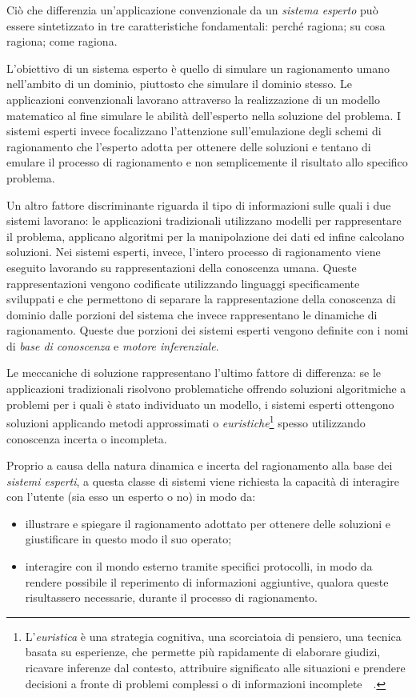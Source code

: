 Ciò che differenzia un'applicazione convenzionale da un \emph{sistema esperto} può essere sintetizzato in tre caratteristiche fondamentali: perché ragiona; su cosa ragiona; come ragiona.

L'obiettivo di un sistema esperto è quello di simulare un ragionamento umano nell'ambito di un dominio, piuttosto che simulare il dominio stesso. Le applicazioni convenzionali lavorano attraverso la realizzazione di un modello matematico al fine simulare le abilità dell'esperto nella soluzione del problema. I sistemi esperti invece focalizzano l'attenzione sull'emulazione degli schemi di ragionamento che l'esperto adotta per ottenere delle soluzioni e tentano di emulare il processo di ragionamento e non semplicemente il risultato allo specifico problema.

Un altro fattore discriminante riguarda il tipo di informazioni sulle quali i due sistemi lavorano: le applicazioni tradizionali utilizzano modelli per rappresentare il problema, applicano algoritmi per la manipolazione dei dati ed infine calcolano soluzioni. Nei sistemi esperti, invece, l'intero processo di ragionamento viene eseguito lavorando su rappresentazioni della conoscenza umana. Queste rappresentazioni vengono codificate utilizzando linguaggi specificamente sviluppati e che permettono di separare la rappresentazione della conoscenza di dominio dalle porzioni del sistema che invece rappresentano le dinamiche di ragionamento. Queste due porzioni dei sistemi esperti vengono definite con i nomi di \emph{base di conoscenza} e \emph{motore inferenziale}.

Le meccaniche di soluzione rappresentano l'ultimo fattore di differenza: se le applicazioni tradizionali risolvono problematiche offrendo soluzioni algoritmiche a problemi per i quali è stato individuato un modello, i sistemi esperti ottengono soluzioni applicando metodi approssimati o \emph{euristiche}\footnote{L’\emph{euristica} è una strategia cognitiva, una scorciatoia di pensiero, una tecnica basata su esperienze, che permette più rapidamente di elaborare giudizi, ricavare inferenze dal contesto, attribuire significato alle situazioni e prendere decisioni a fronte di problemi complessi o di informazioni incomplete~\cite{euristiche1}~\cite{kahneman1982judgment}.} spesso utilizzando conoscenza incerta o incompleta.

Proprio a causa della natura dinamica e incerta del ragionamento alla base dei \emph{sistemi esperti}, a questa classe di sistemi viene richiesta la capacità di interagire con l'utente (sia esso un esperto o no) in modo da:
\begin{itemize}
	\item illustrare e spiegare il ragionamento adottato per ottenere delle soluzioni e giustificare in questo modo il suo operato; 
	\item interagire con il mondo esterno tramite specifici protocolli, in modo da rendere possibile il reperimento di informazioni aggiuntive, qualora queste risultassero necessarie, durante il processo di ragionamento.
\end{itemize}

